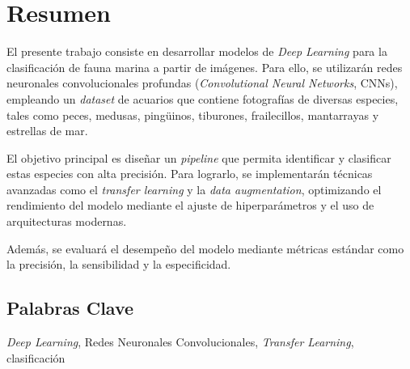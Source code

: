 \section*{Resumen}

\noindent
El presente trabajo consiste en desarrollar modelos de \textit{Deep Learning} para la clasificación de fauna marina a partir de imágenes. Para ello,
se utilizarán redes neuronales convolucionales profundas (\textit{Convolutional Neural Networks}, CNNs), empleando un \textit{dataset} de acuarios
que contiene fotografías de diversas especies, tales como peces, medusas, pingüinos, tiburones, frailecillos, mantarrayas y estrellas de mar. 

\quad

\noindent
El objetivo principal es diseñar un \textit{pipeline} que permita identificar y clasificar estas especies con alta precisión. Para lograrlo, se 
implementarán técnicas avanzadas como el \textit{transfer learning} y la \textit{data augmentation}, optimizando el rendimiento del modelo mediante 
el ajuste de hiperparámetros y el uso de arquitecturas modernas.

\quad

\noindent
Además, se evaluará el desempeño del modelo mediante métricas estándar como la precisión, la sensibilidad y la especificidad.

\subsection*{Palabras Clave}

\noindent
\textit{Deep Learning}, Redes Neuronales Convolucionales, \textit{Transfer Learning}, clasificación